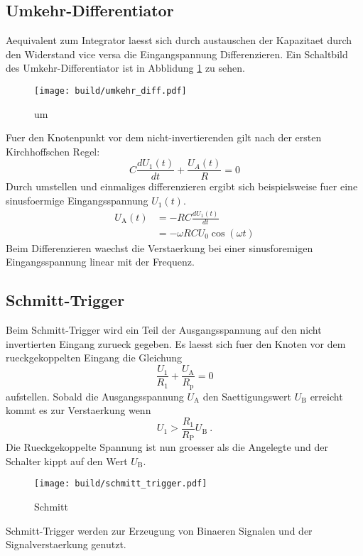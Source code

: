 \subsection{Umkehr-Differentiator}%
\label{sub:umkehr_differentiator}
Aequivalent zum Integrator laesst sich durch austauschen der Kapazitaet durch
den Widerstand vice versa die Eingangspannung Differenzieren.
Ein Schaltbild des Umkehr-Differentiator ist in Abblidung \ref{fig:diff} zu
sehen.
\begin{figure}[h]
		\centering
		\texttt{[image: build/umkehr\_diff.pdf]}
		\caption{um \cite{anleitung}}
		\label{fig:diff}
\end{figure}
Fuer den Knotenpunkt vor dem nicht-invertierenden gilt nach der ersten
Kirchhoffschen Regel:
\begin{equation}
		C \frac{d U_1(t)}{dt} + \frac{U_A(t)}{R} = 0
\end{equation}
Durch umstellen und einmaliges differenzieren ergibt sich beispielsweise fuer
eine sinusfoermige Eingangsspannung $U_1(t)$.
\begin{align}
		U_\text{A}(t) &= - RC \frac{dU_1(t)}{dt} \\
				   &= - \omega R C U_0 \cos(\omega t)
\end{align}
Beim Differenzieren waechst die Verstaerkung bei einer sinusforemigen
Eingangsspannung linear mit der Frequenz.

\subsection{Schmitt-Trigger}%
\label{sub:schmitt_trigger}

Beim Schmitt-Trigger wird ein Teil der Ausgangsspannung auf den nicht
invertierten Eingang zurueck gegeben.
Es laesst sich fuer den Knoten vor dem rueckgekoppelten Eingang die Gleichung 
\begin{equation}
		\frac{U_1}{R_1} + \frac{U_\text{A}}{R_\text{p}} = 0
\end{equation}
aufstellen.
Sobald die Ausgangsspannung $U_\text{A}$ den Saettigungswert $U_\text{B}$ erreicht kommt es zur
Verstaerkung wenn 
\begin{equation}
		\label{eq:schmitt}
		U_1 > \frac{R_1}{R_\text{P}} U_\text{B} \ .
\end{equation}
Die Rueckgekoppelte Spannung ist nun groesser als die Angelegte und der Schalter
kippt auf den Wert $U_\text{B}$.
\begin{figure}[h]
		\centering
		\texttt{[image: build/schmitt\_trigger.pdf]}
		\caption{Schmitt \cite{anleitung}}
		\label{fig:}
\end{figure}
Schmitt-Trigger werden zur Erzeugung von Binaeren Signalen und der
Signalverstaerkung genutzt.

